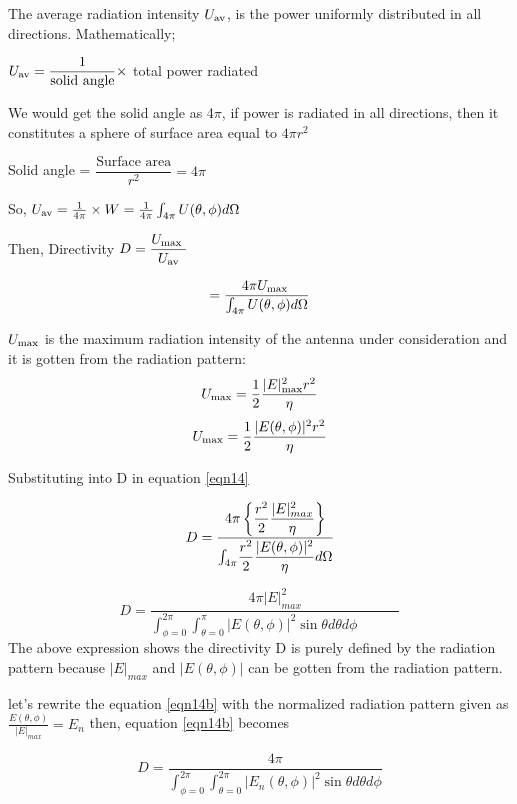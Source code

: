 \begin{enumerate}
	The average radiation intensity $U_{\textnormal{av}}$, is the power uniformly distributed in all directions. Mathematically;
	
	$U_{\textnormal{av}}=\dfrac{1}{\textnormal{solid angle}} \times$ total power radiated
	
	We would get the solid angle as 4$\pi$, if power is radiated in all directions, then it constitutes a sphere of surface area equal to $4\pi r^{2}$
	
	Solid angle = $\dfrac{\text{Surface area}}{r^{2}} = 4\pi$
	
	So, $U_{\textnormal{av}}=\frac{1}{4\pi} \times W = \frac{1}{4\pi}\int_{4\pi}U(\theta ,\phi)d\Omega$
	
	Then, Directivity $D=\dfrac{U_{\textnormal{max
	}}}{U_{\textnormal{av}}}$ 

	\begin{equation}
		= \dfrac{4\pi U_\textnormal{max
		}}{\int_{4\pi}U(\theta,\phi)d\Omega}
		\label{eqn14}
	\end{equation}
	
	$U_{\textnormal{max}}$ is the maximum radiation intensity of the antenna under consideration and it is gotten from the radiation pattern:
	$$U_{\textnormal{max}}=\frac{1}{2}\frac{|E|^{2}_\textnormal{max}r^{2}}{\eta}$$
	$$U_{\textnormal{max}}=\frac{1}{2}\frac{|E(\theta,\phi)|^{2}r^{2}}{\eta}$$
	
	Substituting into D in equation \ref{eqn14}
	
	$$
	D = \dfrac{4\pi\left\{\dfrac{r^2}{2}
		\dfrac{|E|^2_{max}}{\eta}\right\}}
	{{\Large \int_{4\pi}}\dfrac{r^2}{2}
		\dfrac{|E(\theta,\phi)|^2}{\eta}d\Omega }
	$$
	
	\begin{equation}
		D = \dfrac{4\pi|E|^2_{max}}{\int^{ 2\pi}_{\phi=0}\int^{ \pi}_{\theta=0}|E(\theta,\phi)|^2\sin\theta d\theta d\phi \qquad \quad}
		\label{eqn14b}
	\end{equation}
	The above expression shows the directivity D is purely defined by the radiation pattern because $|E|_{max}$ and $|E(\theta, \phi)|$ can be gotten from the radiation pattern.
	
	let's rewrite the equation \ref{eqn14b} with the normalized radiation pattern given as $\frac{E(\theta, \phi)}{|E|_{max}} = E_n$ then, equation \ref{eqn14b} becomes
	
	\begin{equation}
		D = \frac{4\pi}{\int_{\phi = 0}^{2\pi}\int_{\theta = 0}^{2\pi}|E_n(\theta, \phi)|^2\sin\theta d\theta d\phi}
		\label{eqn14c}
	\end{equation}
	

\end{enumerate}
